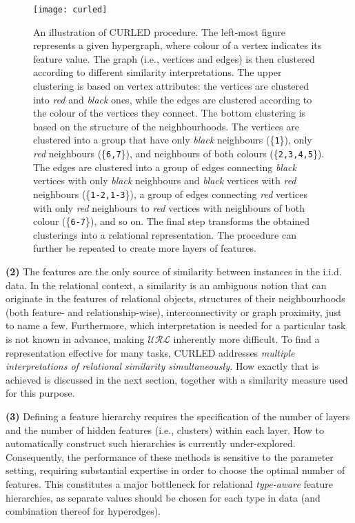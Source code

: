 \begin{figure}
  \centering
  \medskip
  \texttt{[image: curled]}
  \caption{An illustration of CURLED procedure. The left-most figure represents a given hypergraph, where colour of a vertex indicates its feature value. The graph (i.e., vertices and edges) is then clustered according to different similarity interpretations. The upper clustering is based on vertex attributes: the vertices are clustered into \textit{red} and \textit{black} ones, while the edges are clustered according to the colour of the vertices they connect. The bottom clustering is based on the structure of the neighbourhoods. The vertices are clustered into a group that have only \textit{black} neighbours (\{{\tt1}\}), only \textit{red} neighbours (\{{\tt 6,7}\}), and neighbours of both colours (\{{\tt 2,3,4,5}\}). The edges are clustered into a group of edges connecting \textit{black} vertices with only \textit{black} neighbours and \textit{black} vertices with \textit{red} neighbours (\{{\tt1-2,1-3}\}), a group of edges connecting \textit{red} vertices with only \textit{red} neighbours to \textit{red} vertices with neighbours of both colour (\{{\tt6-7}\}), and so on. The final step transforms the obtained clusterings into a relational representation. The procedure can further be repeated to create more layers of features. }
  \label{fig:curled}
\end{figure}


\textbf{(2)}
The features are the only source of similarity between instances in the i.i.d. data.
In the relational context, a similarity is an ambiguous notion that can originate in the  features of relational objects, structures of their neighbourhoods (both feature- and relationship-wise), interconnectivity or graph proximity, just to name a few.
Furthermore, which interpretation is needed for a particular task is not known in advance, making $\mathcal{URL}$ inherently more difficult.
To find a representation effective for many tasks, CURLED addresses \textit{multiple interpretations of relational similarity simultaneously.}
How exactly that is achieved is discussed in the next section, together with a similarity measure used for this purpose.



\textbf{(3)}
Defining a feature hierarchy requires the specification of the number of layers and the number of hidden features (i.e., clusters) within each layer.
How to automatically construct such hierarchies is currently under-explored.
Consequently, the performance of these methods is sensitive to the parameter setting, requiring substantial expertise in order to choose the optimal number of features.
This constitutes a major bottleneck for relational \textit{type-aware} feature hierarchies, as separate values should be chosen for each type in data (and combination thereof for hyperedges).

